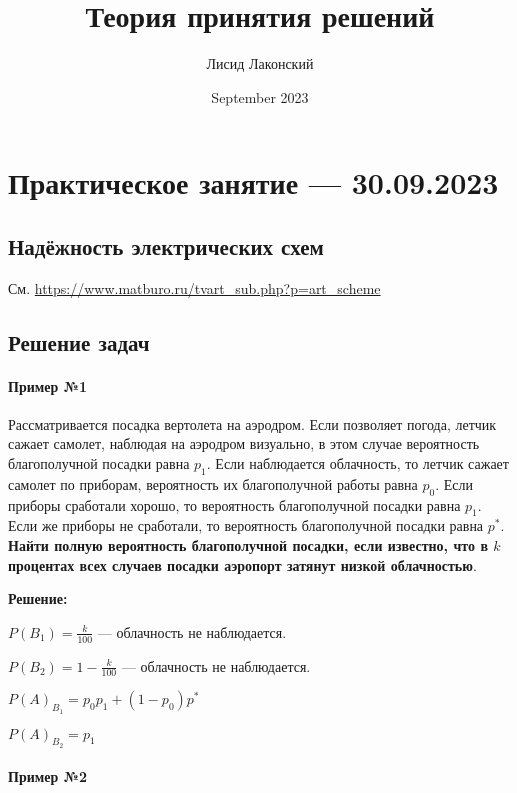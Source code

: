 \documentclass{article}
\title{Теория принятия решений}
\author{Лисид Лаконский}
\date{September 2023}
\begin{document}
\raggedright

\maketitle

\tableofcontents
\pagebreak

\section{Практическое занятие — 30.09.2023}

\subsection{Надёжность электрических схем}

См. \url{https://www.matburo.ru/tvart_sub.php?p=art_scheme}

\subsection{Решение задач}

\paragraph{Пример №1}

Рассматривается посадка вертолета на аэродром. Если позволяет погода, летчик сажает самолет, наблюдая на аэродром визуально, в этом случае вероятность благополучной посадки равна $p_1$. Если наблюдается облачность, то летчик сажает самолет по приборам, вероятность их благополучной работы равна $p_0$. Если приборы сработали хорошо, то вероятность благополучной посадки равна $p_1$. Если же приборы не сработали, то вероятность благополучной посадки равна $p^{*}$. \textbf{Найти полную вероятность благополучной посадки, если известно, что в $k$ процентах всех случаев посадки аэропорт затянут низкой облачностью}.

\textbf{Решение:}

$P(B_1) = \frac{k}{100}$ — облачность не наблюдается.

$P(B_2) = 1 - \frac{k}{100}$ — облачность не наблюдается.

$P(A)_{B_1} = p_0 p_1 + (1 - p_0) p^{*}$

$P(A)_{B_2} = p_1$

\paragraph{Пример №2}
\end{document}
